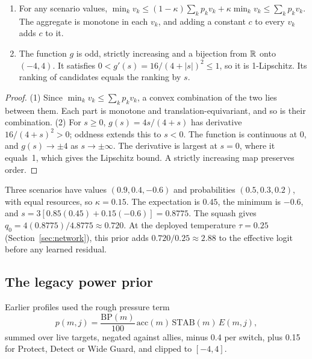 \begin{proposition}
\label{prop:squash}
\leavevmode
\begin{enumerate}
  \item For any scenario values,
    $\min_kv_k\le(1-\kappa)\sum_kp_kv_k+\kappa\min_kv_k\le\sum_kp_kv_k$.
    The aggregate is monotone in each $v_k$, and adding a constant $c$ to every
    $v_k$ adds $c$ to it.
  \item The function $g$ is odd, strictly increasing and a bijection from $\mathbb{R}$
    onto $(-4,4)$. It satisfies $0<g'(s)=16/(4+|s|)^2\le1$, so it is
    1-Lipschitz. Its ranking of candidates equals the ranking by $s$.
\end{enumerate}
\end{proposition}
\begin{proof}
(1) Since $\min_kv_k\le\sum_kp_kv_k$, a convex combination of the two lies
between them. Each part is monotone and translation-equivariant, and so is
their combination. (2) For $s\ge0$, $g(s)=4s/(4+s)$ has derivative
$16/(4+s)^2>0$; oddness extends this to $s<0$. The function is continuous at
0, and $g(s)\to\pm4$ as $s\to\pm\infty$. The derivative is largest at $s=0$,
where it equals~1, which gives the Lipschitz bound. A strictly increasing map
preserves order.
\end{proof}


\begin{example}
\label{ex:strategic}
Three scenarios have values $(0.9,0.4,-0.6)$ and probabilities
$(0.5,0.3,0.2)$, with equal resources, so $\kappa=0.15$. The expectation is
$0.45$, the minimum is $-0.6$, and
$s=3[0.85(0.45)+0.15(-0.6)]=0.8775$. The squash gives
$q_0=4(0.8775)/4.8775\approx0.720$. At the deployed temperature $\tau=0.25$
(Section~\ref{sec:network}), this prior adds $0.720/0.25\approx2.88$ to the
effective logit before any learned residual.
\end{example}

\subsection{The legacy power prior}
\label{sec:legacyprior}
Earlier profiles used the rough pressure term
\begin{equation}
  p(m,j)=\frac{\mathrm{BP}(m)}{100}\,\mathrm{acc}(m)\,\mathrm{STAB}(m)\,E(m,j),
\label{eq:prior}
\end{equation}
summed over live targets, negated against allies, minus 0.4 per switch, plus
0.15 for Protect, Detect or Wide Guard, and clipped to $[-4,4]$.

